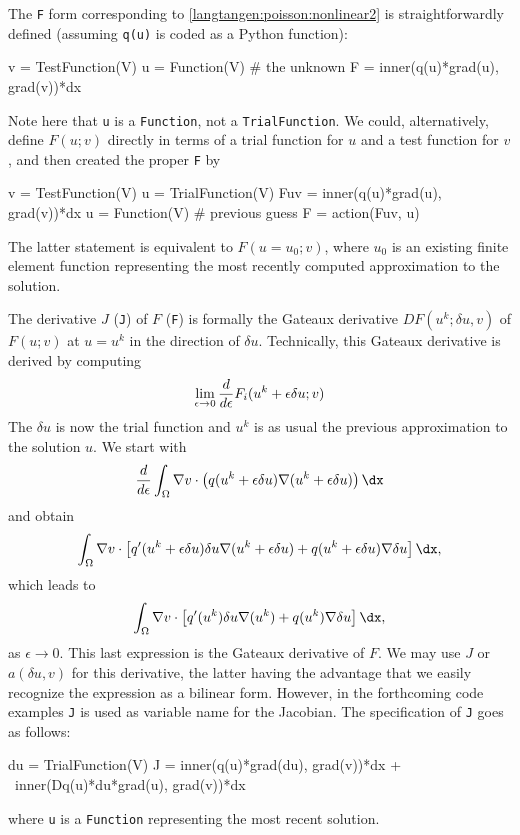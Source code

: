 The {\fontsize{10pt}{10pt}\texttt{F}} form corresponding to \eqref{langtangen:poisson:nonlinear2}
is straightforwardly defined (assuming {\fontsize{10pt}{10pt}\texttt{q(u)}} is
coded as a Python function):
\begin{python}
v = TestFunction(V)
u = Function(V)  # the unknown
F = inner(q(u)*grad(u), grad(v))*dx
\end{python}
Note here that {\fontsize{10pt}{10pt}\texttt{u}} is a {\fontsize{10pt}{10pt}\texttt{Function}}, not a {\fontsize{10pt}{10pt}\texttt{TrialFunction}}.
We could, alternatively, define $F(u;v)$ directly in terms of
a trial function for $u$ and a test function for $v$, and then
created the proper {\fontsize{10pt}{10pt}\verb!F!} by
\begin{python}
v = TestFunction(V)
u = TrialFunction(V)
Fuv = inner(q(u)*grad(u), grad(v))*dx
u = Function(V)  # previous guess
F = action(Fuv, u)
\end{python}
The latter statement is equivalent to $F(u=u_0; v)$, where $u_0$ is
an existing finite element function representing the most recently
computed approximation to the solution.

The derivative $J$ ({\fontsize{10pt}{10pt}\texttt{J}}) of $F$ ({\fontsize{10pt}{10pt}\texttt{F}}) is formally the 
Gateaux derivative $DF(u^k; \delta u, v)$
of $F(u;v)$ at $u=u^k$ in the direction of $\delta u$.
Technically, this Gateaux derivative is derived by computing
\begin{equation}
\lim_{\epsilon\rightarrow 0}{d\over d\epsilon} F_i(u^k + \epsilon\delta u; v)
\label{langtangen:poisson:nonlinear:Gateaux1}
\end{equation}
The $\delta u$ is now the trial function and $u^k$ is as usual the previous
approximation to the solution $u$.
We start with
\[ 
{d\over d\epsilon}\int_\Omega \nabla v\cdot\left( q(u^k + \epsilon\delta u)
\nabla (u^k + \epsilon\delta u)\right)\dx
\]
and obtain
\[
\int_\Omega \nabla v\cdot\left\lbrack
q'(u^k + \epsilon\delta u)\delta u
\nabla (u^k + \epsilon\delta u)
+
q(u^k + \epsilon\delta u)
\nabla \delta u
\right\rbrack\dx,
\]
which leads to
\begin{equation}
\int_\Omega \nabla v\cdot\left\lbrack
q'(u^k)\delta u
\nabla (u^k)
+
q(u^k)
\nabla \delta u
\right\rbrack\dx,
\end{equation}
as $\epsilon\rightarrow 0$.
This last expression is the Gateaux derivative of $F$. We may use $J$ or
$a(\delta u, v)$ for this derivative, the latter having the advantage
that we easily recognize the expression as a bilinear form. However, in
the forthcoming code examples {\fontsize{10pt}{10pt}\texttt{J}} is used as variable name for
the Jacobian.
The specification of {\fontsize{10pt}{10pt}\texttt{J}} goes as follows:
\begin{python}
du = TrialFunction(V)
J = inner(q(u)*grad(du), grad(v))*dx + \
    inner(Dq(u)*du*grad(u), grad(v))*dx
\end{python}
where {\fontsize{10pt}{10pt}\texttt{u}} is a {\fontsize{10pt}{10pt}\texttt{Function}} representing the most recent solution.

